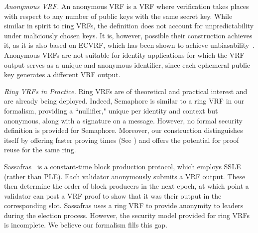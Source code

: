 \smallskip
\noindent\textit{Anonymous VRF.}  An anonymous VRF \cite{GaneshOT19} is a VRF where verification takes places with respect to any number of public keys with the same secret key.  While similar in spirit to ring VRFs, the definition does not account for unpredictability under maliciously chosen keys.  It is, however, possible their construction achieves it, as it is also based on ECVRF, which has been shown to achieve unbiasability~\cite{UnbiasableVRF}.
 Anonymous VRFs are not suitable for identity applications for which the VRF output serves as a unique and anonymous identifier, since each ephemeral public key generates a different VRF output.


\smallskip
\noindent\textit{Ring VRFs in Practice.} 
Ring VRFs are of theoretical and practical interest and are already being deployed.
Indeed, Semaphore \cite{Semaphore} is similar to a ring VRF in our formalism, providing a ``nullifier," unique per identity and context but anonymous, along with a signature on a message. However, no formal security definition is provided for Semaphore.  Moreover, our construction distinguishes itself by offering faster proving times (See \cite{implementation})  and offers the potential for proof reuse for the same ring.

Sassafras~\cite{Sassafras} is a constant-time block production protocol, which employs SSLE (rather than PLE).
Each validator anonymously submits a VRF output. These then determine the order of block producers in the next epoch, at which point a validator can post a VRF proof to show that it was their output in the corresponding slot.
Sassafras uses a ring VRF to provide anonymity to leaders during the election process.
However, the security model provided for ring VRFs is incomplete.  
We believe our formalism fills this gap.

